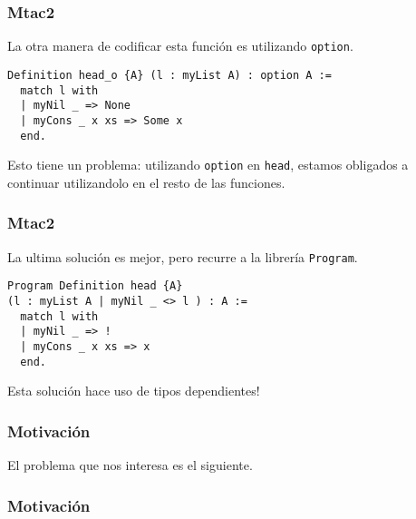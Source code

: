 \documentclass{beamer}
\begin{document}

\begin{frame}[fragile]
\frametitle{Mtac2}

La otra manera de codificar esta función es utilizando \lstinline{option}.

\begin{lstlisting}
Definition head_o {A} (l : myList A) : option A :=
  match l with
  | myNil _ => None
  | myCons _ x xs => Some x
  end.
\end{lstlisting}

Esto tiene un problema: utilizando \lstinline{option} en \lstinline{head}, estamos obligados a continuar utilizandolo en el resto de las funciones.

\end{frame}

\begin{frame}[fragile]
\frametitle{Mtac2}

La ultima solución es mejor, pero recurre a la librería \lstinline{Program}.

\begin{lstlisting}
Program Definition head {A}
(l : myList A | myNil _ <> l ) : A :=
  match l with
  | myNil _ => !
  | myCons _ x xs => x
  end.
\end{lstlisting}

Esta solución hace uso de tipos dependientes!
\end{frame}

\begin{frame}
\frametitle{Motivación}

El problema que nos interesa es el siguiente.



\end{frame}

\begin{frame}
\frametitle{Motivación}
\end{frame}
\end{document}

